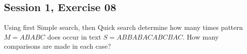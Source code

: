 \subsection{Session 1, Exercise 08}


Using first Simple search, then Quick search determine how many times pattern $M = ABABC$ does occur in text $S = ABBABACABCBAC$. How many comparisons are made in each case?

